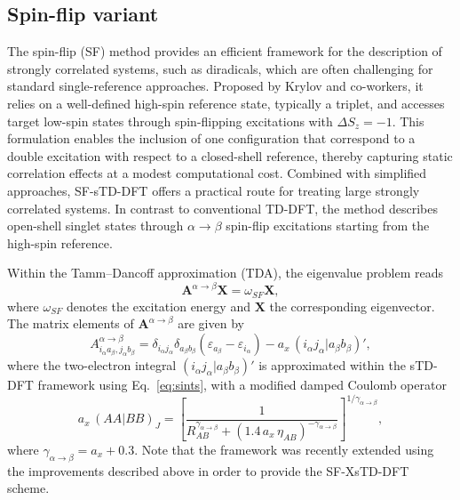 \documentclass[%
 aip,
 amsmath,amssymb,
preprint,%
]{revtex4-2}
\begin{document}
\subsection{Spin-flip variant}

The spin-flip (SF) method provides an efficient framework for the description of strongly correlated systems, such as diradicals, which are often challenging for standard single-reference approaches.  
Proposed by Krylov and co-workers,\cite{krylovSizeconsistentWaveFunctions2001} it relies on a well-defined high-spin reference state, typically a triplet, and accesses target low-spin states through spin-flipping excitations with $\Delta S_z = -1$.  
This formulation enables the inclusion of one configuration that correspond to  a double excitation with respect to a closed-shell reference, thereby capturing static correlation effects at a modest computational cost.  
Combined with simplified approaches, SF-sTD-DFT offers a practical route for treating large strongly correlated systems.\cite{dewergifosseSimplifiedSpinFlipTimeDependent2019}  
In contrast to conventional TD-DFT, the method describes open-shell singlet states through $\alpha \rightarrow \beta$ spin-flip excitations starting from the high-spin reference.\cite{dewergifosseAreFullyConjugated2019}

Within the Tamm--Dancoff approximation (TDA), the eigenvalue problem reads
\begin{equation*}
	\mathbf{A}^{\alpha \rightarrow \beta} \mathbf{X} = \omega_{SF} \mathbf{X},
\end{equation*}
where $\omega_{SF}$ denotes the excitation energy and $\mathbf{X}$ the corresponding eigenvector.  
The matrix elements of $\mathbf{A}^{\alpha \rightarrow \beta}$ are given by
\begin{equation*}
	A^{\alpha\to\beta}_{i_\alpha a_\beta, j_\alpha b_\beta} =  \delta_{i_\alpha j_\alpha}\delta_{a_\beta b_\beta} (\varepsilon_{a_\beta} - \varepsilon_{i_\alpha}) - a_x\,(i_\alpha j_\alpha|a_\beta b_\beta)',
\end{equation*}
where the two-electron integral $(i_\alpha j_\alpha|a_\beta b_\beta)'$ is approximated within the sTD-DFT framework using Eq.~\eqref{eq:sints}, with a modified damped Coulomb operator
\begin{equation*}
	a_x\,(AA|BB)_J =
	\left[\frac{1}{R_{AB}^{\gamma_{\alpha\to\beta}} + \left(1.4\,a_x\,\eta_{AB}\right)^{-\gamma_{\alpha\to\beta}}}\right]^{1/\gamma_{\alpha\to\beta}},
\end{equation*}
where $\gamma_{\alpha\to\beta} = a_x + 0.3$.  
Note that the framework was recently extended using the improvements described above in order to provide the SF-XsTD-DFT scheme.
\end{document}

